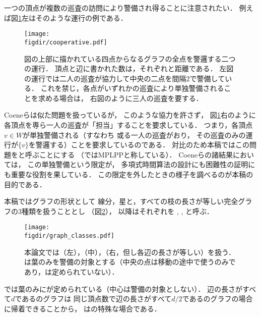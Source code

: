 一つの頂点が複数の巡査の訪問により警備され得ることに注意されたい．
例えば図\ref{figure: cooperative}左はそのような運行の例である．
\begin{figure}
  \begin{center}
    \texttt{[image: \\figdir/cooperative.pdf]}
    \caption{図の上部に描かれている四点からなるグラフの全点を警邏する二つの運行．
      頂点と辺に書かれた数は，それぞれ{\maxIdletime}と距離である．
      左図の運行では二人の巡査が協力して中央の二点を間隔$2$で警備している．
      これを禁じ，各点がいずれかの巡査により単独警備されることを求める場合は，
      右図のように三人の巡査を要する．}
    \label{figure: cooperative}
  \end{center}
\end{figure}
Coeneら\cite{coene2011charlemagne}は似た問題を扱っているが，
このような協力を許さず，
図\ref{figure: cooperative}右のように
各頂点を専ら一人の巡査が「担当」することを要求している．
つまり，各頂点$v \in W$が単独警備される（すなわち
或る一人の巡査がおり，
その巡査のみの運行が$\{v\}$を警邏する）ことを要求しているのである．
対比のため本稿ではこの問題を{\independentPatProb}と呼ぶことにする
（\cite{coene2011charlemagne}ではMPLPPと称している）．
Coeneら\cite{coene2011charlemagne}の諸結果においては，
この単独警備という限定が，
多項式時間算法の設計にも困難性の証明にも重要な役割を果している．
この限定を外したときの様子を調べるのが本稿の目的である．

本稿ではグラフの形状として
線分，星と，すべての枝の長さが等しい完全グラフの3種類を扱うこととし
（図\ref{figure: graph_classes}），
以降はそれぞれを {\graphLine}, {\graphStar}, {\graphUnit}と呼ぶ．
\begin{figure}
  \begin{center}
    \texttt{[image: \\figdir/graph\_classes.pdf]}
    \caption{本論文では{\graphLine}（左），{\graphStar}（中），{\graphUnit}（右，但し各辺の長さが等しい）を扱う．{\graphStar}は葉のみを警備の対象とする（中央の点は移動の途中で使うのみであり，{\maxIdletime}は定められていない）．}
    \label{figure: graph_classes}
  \end{center}
\end{figure}
{\graphStar}では葉のみに{\maxIdletime}が定められている（中心は警備の対象としない）．
辺の長さがすべて$d$である{\graphUnit}のグラフは
同じ頂点数で辺の長さがすべて$d/2$である{\graphStar}のグラフの場合に帰着できることから，
{\graphUnit}は{\graphStar}の特殊な場合である．



